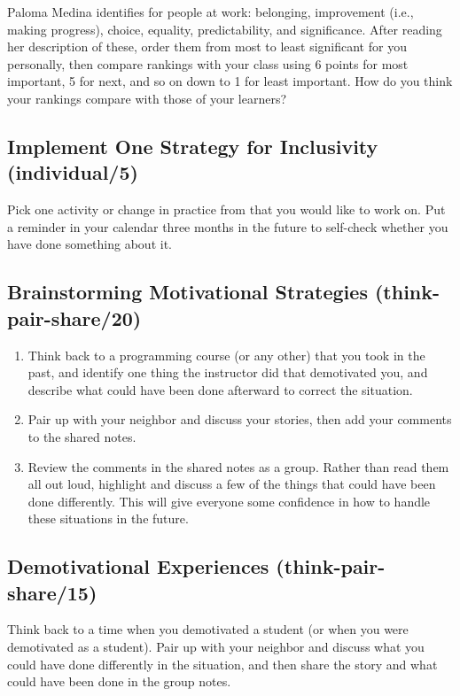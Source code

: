 Paloma Medina identifies  for people at
work: belonging, improvement (i.e., making progress), choice,
equality, predictability, and significance. After reading her
description of these, order them from most to least significant for
you personally, then compare rankings with your class using 6 points
for most important, 5 for next, and so on down to 1 for least
important. How do you think your rankings compare with those of your
learners?

\subsection*{Implement One Strategy for Inclusivity (individual/5)}

Pick one activity or change in practice from \cite{Lee2017} that you
would like to work on. Put a reminder in your calendar three months in
the future to self-check whether you have done something about it.

\subsection*{Brainstorming Motivational Strategies (think-pair-share/20)}

\begin{enumerate}
\item
  Think back to a programming course (or any other) that you took in
  the past, and identify one thing the instructor did that demotivated
  you, and describe what could have been done afterward to correct the
  situation.
\item
  Pair up with your neighbor and discuss your stories, then add your
  comments to the shared notes.
\item
  Review the comments in the shared notes as a group. Rather than read
  them all out loud, highlight and discuss a few of the things that
  could have been done differently. This will give everyone some
  confidence in how to handle these situations in the future.
\end{enumerate}

\subsection*{Demotivational Experiences (think-pair-share/15)}

Think back to a time when you demotivated a student (or when you were
demotivated as a student). Pair up with your neighbor and discuss what
you could have done differently in the situation, and then share the
story and what could have been done in the group notes.

